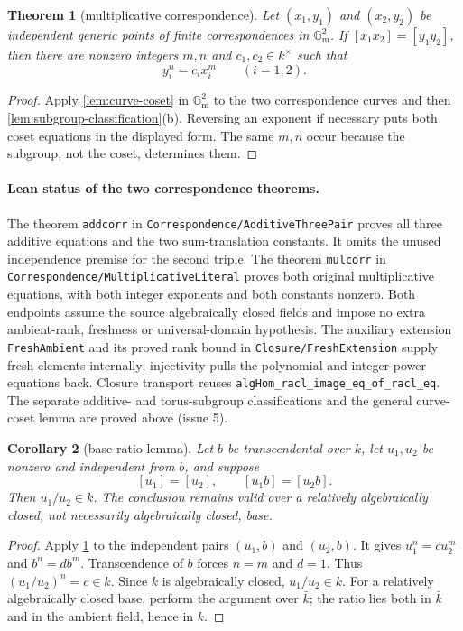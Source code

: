 \documentclass[11pt,oneside]{article}
\newtheorem{theorem}{Theorem}[section]
\newtheorem{corollary}[theorem]{Corollary}
\theoremstyle{definition}
\theoremstyle{remark}
\newcommand{\Gm}{\mathbb G_{\mathrm m}}
\newcommand{\lean}[1]{\nolinkurl{#1}}
\begin{document}
\begin{theorem}[multiplicative correspondence]\label{thm:mulcorr}
Let $(x_1,y_1)$ and $(x_2,y_2)$ be independent generic points of finite
correspondences in $\Gm^2$.  If
$[x_1x_2]=[y_1y_2]$, then there are nonzero integers $m,n$ and
$c_1,c_2\in k^\times$ such that
\[
 y_i^n=c_i x_i^m\qquad(i=1,2).
\]
\end{theorem}
\begin{proof}
Apply \cref{lem:curve-coset} in $\Gm^2$ to the two correspondence curves and then
\cref{lem:subgroup-classification}(b).  Reversing an exponent if necessary puts both
coset equations in the displayed form.  The same $m,n$ occur because the subgroup, not
the coset, determines them.
\end{proof}

\paragraph{Lean status of the two correspondence theorems.}
The theorem \lean{addcorr} in \lean{Correspondence/AdditiveThreePair} proves all three
additive equations and the two sum-translation constants. It omits the unused independence
premise for the second triple. The theorem \lean{mulcorr} in
\lean{Correspondence/MultiplicativeLiteral} proves both original multiplicative equations,
with both integer exponents and both constants nonzero. Both endpoints assume the source
algebraically closed fields and impose no extra ambient-rank, freshness or universal-domain
hypothesis. The auxiliary extension \lean{FreshAmbient} and its proved rank bound in
\lean{Closure/FreshExtension} supply fresh elements internally; injectivity pulls the
polynomial and integer-power equations back. Closure transport reuses
\lean{algHom_racl_image_eq_of_racl_eq}. The separate additive- and torus-subgroup
classifications and the general curve-coset lemma are proved above (issue 5).

\begin{corollary}[base-ratio lemma]\label{cor:base-ratio}
Let $b$ be transcendental over $k$, let $u_1,u_2$ be nonzero and independent from $b$,
and suppose
\[
 [u_1]=[u_2],\qquad [u_1b]=[u_2b].
\]
Then $u_1/u_2\in k$.  The conclusion remains valid over a relatively algebraically
closed, not necessarily algebraically closed, base.
\end{corollary}
\begin{proof}
Apply \cref{thm:mulcorr} to the independent pairs $(u_1,b)$ and $(u_2,b)$.  It gives
$u_1^n=c u_2^m$ and $b^n=d b^m$.  Transcendence of $b$ forces $n=m$ and $d=1$.
Thus $(u_1/u_2)^n=c\in k$.  Since $k$ is algebraically closed, $u_1/u_2\in k$.
For a relatively algebraically closed base, perform the argument over $\bar k$; the ratio
lies both in $\bar k$ and in the ambient field, hence in $k$.
\end{proof}
\end{document}
